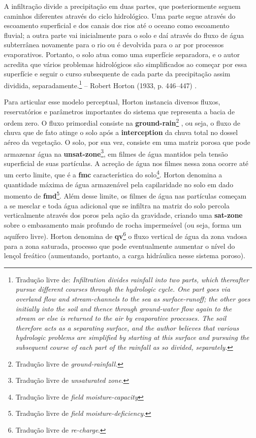 \documentclass[./main.tex]{subfiles}
\begin{document}
\begin{adjustwidth}{100pt}{0pt}
\medskip
\small A infiltração divide a precipitação em duas partes, que posteriormente seguem caminhos diferentes através do ciclo hidrológico. Uma parte segue através do escoamento superficial e dos canais dos rios até o oceano como escoamento fluvial; a outra parte vai inicialmente para o solo e daí através do fluxo de água subterrânea novamente para o rio ou é devolvida para o ar por processos evaporativos. Portanto, o solo atua como uma superfície separadora, e o autor acredita que vários problemas hidrológicos são simplificados ao começar por essa superfície e seguir o curso subsequente de cada parte da precipitação assim dividida, separadamente.\footnote{Tradução livre de: \textit{Infiltration divides rainfall into two parts, which thereafter pursue different courses through the hydrologic cycle. One part goes via overland flow and stream-channels to the sea as surface-runoff; the other goes initially into the soil and thence through ground-water flow again to the stream or else is returned to the air by evaporative processes. The soil therefore acts as a separating surface, and the author believes that various hydrologic problems are simplified by starting at this surface and pursuing the subsequent course of each part of the rainfall as so divided, separately.}} -- Robert Horton (1933, p. 446–447) \cite{Horton1933}. 
\medskip
\end{adjustwidth}

\par Para articular esse modelo perceptual, Horton instancia diversos fluxos, reservatórios e parâmetros importantes do sistema que representa a bacia de ordem zero. O fluxo primordial consiste na \textbf{\gls{ground-rain}}\footnote{Tradução livre de \textit{ground-rainfall.}} , ou seja, o fluxo de chuva que de fato atinge o solo após a \textbf{\gls{interception}} da chuva total no dossel aéreo da vegetação. O solo, por sua vez, consiste em uma matriz porosa que pode armazenar água na \textbf{\gls{unsat-zone}}\footnote{Tradução livre de \textit{unsaturated zone}.}, em filmes de água mantidos pela tensão superficial de suas partículas. A acreção de água nos filmes nessa zona ocorre até um certo limite, que é a \textbf{\gls{fmc}} característica do solo\footnote{Tradução livre de \textit{field moisture-capacity}}. Horton denomina a quantidade máxima de água armazenável pela capilaridade no solo em dado momento de \textbf{\gls{fmd}}\footnote{Tradução livre de \textit{field moisture-deficiency}.}. Além desse limite, os filmes de água nas partículas começam a se mesclar e toda água adicional que se infiltra na matriz do solo percola verticalmente através dos poros pela ação da gravidade, criando uma \textbf{\gls{sat-zone}} sobre o embasamento mais profundo de rocha impermeável (ou seja, forma um aquífero livre). Horton denomina de \textbf{\gls{qv}}\footnote{Tradução livre de \textit{re-charge}.} o fluxo vertical de água da zona vadosa para a zona saturada, processo que pode eventualmente aumentar o nível do lençol freático (aumentando, portanto, a carga hidráulica nesse sistema poroso).
\end{document}
